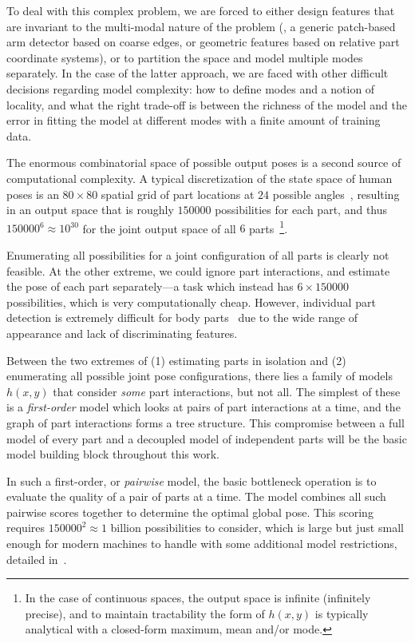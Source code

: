 To deal with this complex problem, we are forced to either design features that 
are invariant to the multi-modal nature of the problem (\eg, a generic 
patch-based arm detector based on coarse edges, or geometric features based on 
relative part coordinate systems), or to partition the space and model multiple 
modes separately.  In the case of the latter approach, we are faced with other 
difficult decisions regarding model complexity: how to define modes and a 
notion of locality, and what the right trade-off is between the richness of the 
model and the error in fitting the model at different modes with a finite 
amount of training data.

The enormous combinatorial space of possible output poses is a second source of 
computational complexity.  A typical discretization of the state space of human 
poses is an $80 \times 80$ spatial grid of part locations at $24$ possible 
angles~\citep{felz05}, resulting in an output space that is roughly $150000$ 
possibilities for each part, and thus $150000^6 \approx 10^{30}$ for the joint 
output space of all $6$ parts~\footnote{In the case of continuous spaces, the 
output space is infinite (infinitely precise), and to maintain tractability the 
form of $h(x,y)$ is typically analytical with a closed-form maximum, mean 
and/or mode.}.

Enumerating all possibilities for a joint configuration of all parts is clearly 
not feasible.  At the other extreme, we could ignore part interactions, and 
estimate the pose of each part separately---a task which instead has $6 \times 
150000$ possibilities, which is very computationally cheap.  However, 
individual part detection is extremely difficult for body 
parts~\citep{andriluka09} due to the wide range of appearance and lack of 
discriminating features.

Between the two extremes of (1) estimating parts in isolation and (2) 
enumerating all possible joint pose configurations, there lies a family of 
models $h(x,y)$ that consider {\em some} part interactions, but not all.  The 
simplest of these is a {\em first-order} model which looks at pairs of part 
interactions at a time, and the graph of part interactions forms a tree 
structure.  This compromise between a full model of every part and a decoupled 
model of independent parts will be the basic model building block throughout 
this work.

In such a first-order, or {\em pairwise} model, the basic bottleneck operation 
is to evaluate the quality of a pair of parts at a time. The model combines all 
such pairwise scores together to determine the optimal global pose.  This 
scoring requires $150000^2 \approx 1$ billion possibilities to consider, which 
is large but just small enough for modern machines to handle with some 
additional model restrictions, detailed in~.

